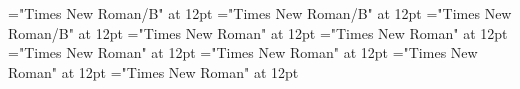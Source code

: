 \documentclass[c5paper,twoside]{article}
\begin{document}
 
\pagestyle{plain} 
\font\spanzxxSectionHeadscrSectioncolumnsscrBookscrBody="Times New Roman/B" at 12pt
\font\SectionHeadscrSectioncolumnsscrBookscrBody="Times New Roman/B" at 12pt
\font\ChapterNumberzxxParagraphscrSectioncolumnsscrBookscrBody="Times New Roman/B" at 12pt
\font\ParagraphscrSectioncolumnsscrBookscrBody="Times New Roman" at 12pt
\font\scrSectioncolumnsscrBookscrBody="Times New Roman" at 12pt
\font\columnsscrBookscrBody="Times New Roman" at 12pt
\font\scrBookscrBody="Times New Roman" at 12pt
\font\imgpicturedivpictureLeft="Times New Roman" at 12pt
\font\picturepictureRight="Times New Roman" at 12pt
\pagestyle{fancy} 
\setlength{\columnsep}{12pt} 
\setlength\columnseprule{0.4pt} 
\begin{multicols}{2}{\raggedright} 
\leftmargin 0pt{\ChapterNumberzxxParagraphscrSectioncolumnsscrBookscrBody{\lettrine{2}}
 {\raggedright} \begin{adjustwidth}{0pt}{0pt}{0pt}{0pt}\begin{center}
\spanzxxSectionHeadscrSectioncolumnsscrBookscrBody{Betlehemfɔ Abí Mɔ }\end{center}\end{adjustwidth} 
 \end{multicols}
\end{document}
